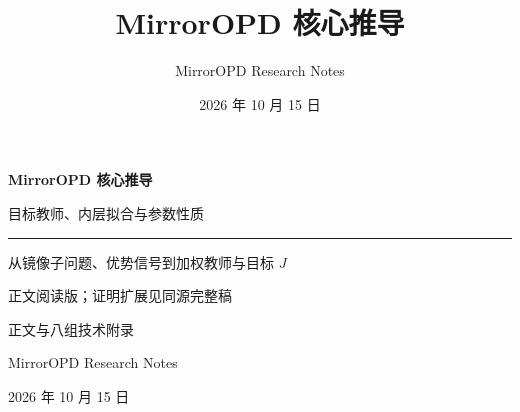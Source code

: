 \documentclass[lang=cn,scheme=chinese,openany]{elegantbook}
\title{MirrorOPD 核心推导}
\author{MirrorOPD Research Notes}
\date{2026 年 10 月 15 日}
\begin{document}
\hypersetup{pageanchor=false}
\begin{titlepage}
\centering
\vspace*{28mm}
{\Huge\bfseries MirrorOPD 核心推导\par}
\vspace{12mm}
{\Large 目标教师、内层拟合与参数性质\par}
\vspace{12mm}
{\color{structurecolor}\rule{0.78\textwidth}{1pt}\par}
\vspace{12mm}
{\large 从镜像子问题、优势信号到加权教师与目标 $J$\par}
\vspace{7mm}
\ifdefined\CoreOnly
{\large 正文阅读版；证明扩展见同源完整稿\par}
\else
{\large 正文与八组技术附录\par}
\fi
\vfill
{\large MirrorOPD Research Notes\par}
\vspace{5mm}
{\large 2026 年 10 月 15 日\par}
\vspace{18mm}
\end{titlepage}
\frontmatter
\hypersetup{pageanchor=true}

\tableofcontents
\mainmatter






\ifdefined\CoreOnly\else
\appendix









\fi
\backmatter
\printbibliography[heading=bibintoc,title={参考文献}]
\end{document}
